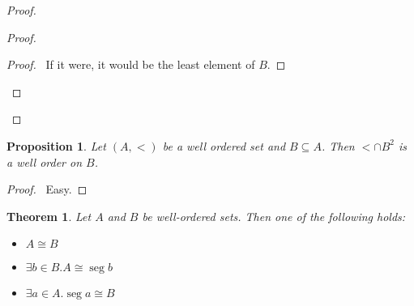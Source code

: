 \documentclass{report}
\let\qed\relax
\newtheorem{proposition}[axiom]{Proposition}
\newtheorem{theorem}[axiom]{Theorem}
\theoremstyle{definition}
\newcommand{\seg}{\ensuremath{\operatorname{seg}}}
\begin{document}
    \begin{proof}
        \pf
        \begin{proof}
            \step{b}{\assume{$\seg t \subseteq A - B$}}
            \begin{proof}
                \pf\ If it were, it would be the least element of $B$.
            \end{proof}
        \end{proof}
        \qed
    \end{proof}

    \begin{proposition}
        Let $(A, <)$ be a well ordered set and $B \subseteq A$. Then $< \cap B^2$ is a well order on $B$.
    \end{proposition}

    \begin{proof}
        \pf\ Easy. \qed
    \end{proof}
    
    \begin{theorem}
        \label{theorem:well_ordered_trichotomy}
        Let $A$ and $B$ be well-ordered sets. Then one of the following holds:
        \begin{itemize}
            \item $A \cong B$
            \item $\exists b \in B. A \cong \seg b$
            \item $\exists a \in A. \seg a \cong B$
        \end{itemize}
    \end{theorem}
\end{document}
